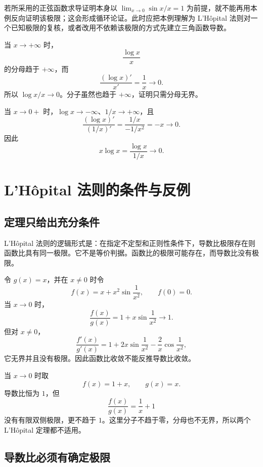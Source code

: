 若所采用的正弦函数求导证明本身以
\(\lim_{x\to0}\sin x/x=1\) 为前提，就不能再用本例反向证明该极限；这会形成循环论证。此时应把本例理解为 L'Hôpital 法则对一个已知极限的复核，或者改用不依赖该极限的方式先建立三角函数导数。

\begin{example}[无穷远与无界分母]
当 \(x\to+\infty\) 时，
\[
 \frac{\log x}{x}
\]
的分母趋于 \(+\infty\)，而
\[
 \frac{(\log x)'}{x'}=\frac1x\longrightarrow0.
\]
所以 \(\log x/x\to0\)。分子虽然也趋于 \(+\infty\)，证明只需分母无界。
\end{example}

\begin{example}
当 \(x\to0+\) 时，\(\log x\to-\infty\)、\(1/x\to+\infty\)，且
\[
 \frac{(\log x)'}{(1/x)'}
 =\frac{1/x}{-1/x^2}=-x\longrightarrow0.
\]
因此
\[
 x\log x=\frac{\log x}{1/x}\longrightarrow0.
\]
\end{example}

\section{L'Hôpital 法则的条件与反例}
\label{sec:lhopital-counterexamples}

\subsection{定理只给出充分条件}

L'Hôpital 法则的逻辑形式是：在指定不定型和正则性条件下，导数比极限存在则函数比具有同一极限。它不是等价判据。函数比的极限可能存在，而导数比没有极限。

\begin{counterexample}[逆命题失败]
令 \(g(x)=x\)，并在 \(x\ne0\) 时令
\[
 f(x)=x+x^2\sin\frac1{x^2},
\qquad f(0)=0.
\]
当 \(x\to0\) 时，
\[
 \frac{f(x)}{g(x)}
 =1+x\sin\frac1{x^2}\longrightarrow1.
\]
但对 \(x\ne0\)，
\[
 \frac{f'(x)}{g'(x)}
 =1+2x\sin\frac1{x^2}
   -\frac2x\cos\frac1{x^2},
\]
它无界并且没有极限。因此函数比收敛不能反推导数比收敛。
\end{counterexample}

\begin{counterexample}[缺少不定型条件]
当 \(x\to0\) 时取
\[
 f(x)=1+x,\qquad g(x)=x.
\]
导数比恒为 \(1\)，但
\[
 \frac{f(x)}{g(x)}=\frac1x+1
\]
没有有限双侧极限，更不趋于 \(1\)。这里分子不趋于零，分母也不无界，所以两个 L'Hôpital 定理都不适用。
\end{counterexample}

\subsection{导数比必须有确定极限}

